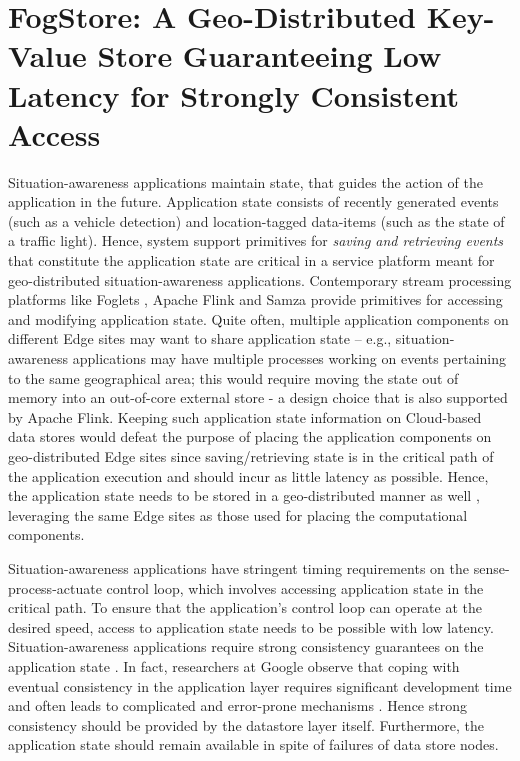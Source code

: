 \chapter{FogStore: A Geo-Distributed Key-Value Store Guaranteeing Low
Latency for Strongly Consistent Access}
\label{sec:fogstore}

Situation-awareness applications maintain state, that guides the action of the application in the future. Application state consists of recently generated events (such as a vehicle detection) and location-tagged data-items (such as the state of a traffic light). Hence, system support primitives for {\it saving and retrieving events} that constitute the application state are critical in a service platform meant for geo-distributed situation-awareness applications. Contemporary stream processing platforms like Foglets \cite{foglets}, Apache Flink \cite{flink} and Samza \cite{samza} provide primitives for accessing and modifying application state. Quite often, multiple application components on different Edge sites may want to share application state -- e.g.,  situation-awareness applications may have multiple processes working on events pertaining to the same geographical area; this would require moving the state out of memory into an out-of-core external store \cite{sharedstateflink} - a design choice that is also supported by Apache Flink. Keeping such application state information on Cloud-based data stores would defeat the purpose of placing the application components on geo-distributed Edge sites since saving/retrieving state is in the critical path of the application execution and should incur as little latency as possible. Hence, the application state needs to be stored in a geo-distributed manner as well \cite{confais2017performance}, leveraging the same Edge sites as those used for placing the computational components. 
\par Situation-awareness applications have stringent timing requirements on the sense-process-actuate control loop, which involves accessing application state in the critical path. To ensure that the application's control loop can operate at the desired speed, access to application state needs to be possible with low latency. Situation-awareness applications require strong consistency guarantees on the application state \cite{consistentstreaming}. In fact, researchers at Google observe that coping with eventual consistency in the application layer requires significant development time and often leads to complicated and error-prone mechanisms \cite{f1}. Hence strong consistency should be provided by the datastore layer itself. Furthermore, the application state should remain available in spite of failures of data store nodes.
